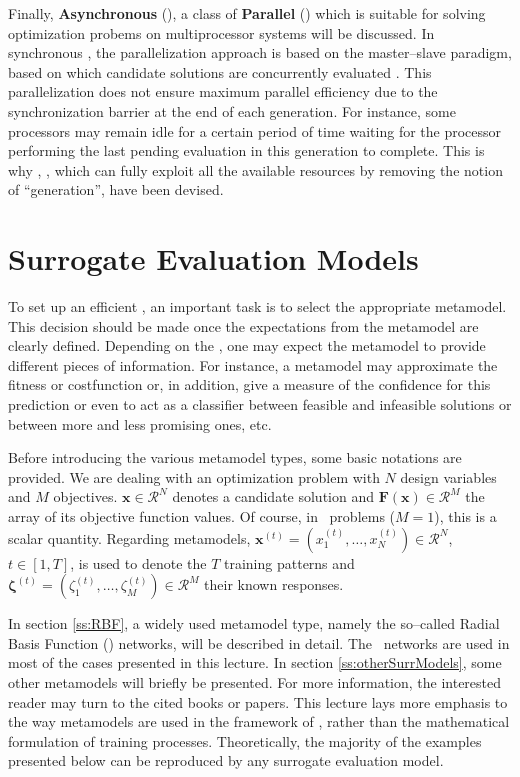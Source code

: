 \documentclass{vki_ls}
\newcommand{\vect}[1]{\bm{#1}}
\newcommand{\set}[1]{\mathcal{#1}}
\begin{document}
Finally, \textbf{Asynchronous \EAs} (\AEAs), a class of \textbf{Parallel \EAs} (\PEAs) which is suitable for solving optimization probems on multiprocessor systems will be discussed. 
In synchronous \EAs, the parallelization approach is based on the 
master--slave paradigm, based on which candidate solutions are concurrently 
evaluated \cite{LTT_2_037, Melab2006}. 
This parallelization does not ensure maximum parallel efficiency due to the 
synchronization barrier at the end of each generation. For instance, some
processors may remain idle for a certain period of time waiting for the 
processor performing the last pending evaluation in this generation to 
complete. 
This is why \AEAs, \cite{LTT_2_040}, which can fully exploit all the 
available resources by removing the notion of ``generation'', have been 
devised.

%
\section[Surrogate Evaluation Models]
{Surrogate Evaluation Models}
\label{s:surrModels}

To set up an efficient \MAEA, an important task is to select the appropriate
metamodel.
This decision should be made once the expectations from the metamodel are 
clearly defined. Depending on the \MAEA, one may expect the metamodel to 
provide different pieces of information. 
For instance, a metamodel may approximate the fitness or costfunction or, in 
addition, give a measure of the confidence for this prediction or even to act 
as a classifier between feasible and infeasible solutions or between more and 
less promising ones, etc.

Before introducing the various metamodel types, some basic notations are provided. 
We are dealing with an optimization problem with $N$ design variables and $M$ objectives. 
$\vect{x}\!\in\!\set{R}^N$ denotes a candidate solution and $\vect{F}(\vect{x})\!\in\!\set{R}^M$ the array of its objective function values. 
Of course, in \SOO\ problems ($M\!=\!1$), this is a scalar quantity. Regarding metamodels, $\vect x^{(t)}\!=\!(x^{(t)}_1,\dots,x^{(t)}_N)\!\in\!\set{R}^N$, $t\!\in\![1,T]$, is used to denote the $T$ training patterns and $\vect{\zeta}^{(t)}\!=\!(\zeta^{(t)}_1,\dots,\zeta^{(t)}_M)\!\in\!\set{R}^M$ their known responses.

In section \ref{ss:RBF}, a widely used metamodel type, namely the so--called Radial Basis Function (\RBF) networks, will be described in detail.
The \RBF\ networks  are used in most of the cases presented in this lecture. In
section \ref{ss:otherSurrModels}, some other metamodels will briefly be 
presented. For more information, the interested reader may turn to the cited books or papers. 
This lecture lays more emphasis to the way metamodels are used in the 
framework of \EAs, rather than the mathematical formulation of training 
processes.
Theoretically, the majority of the examples presented below can be reproduced by any surrogate evaluation model.
\end{document}
